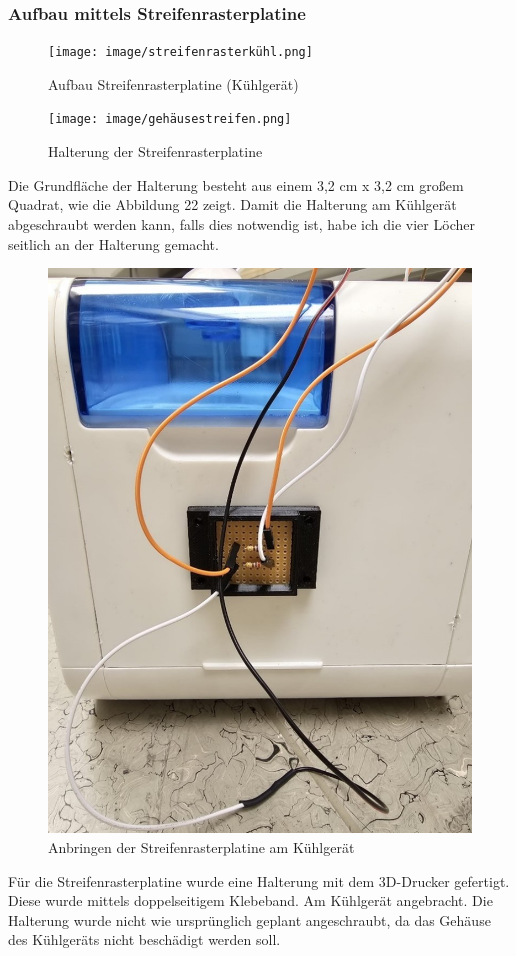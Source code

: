 \subsubsection{Aufbau mittels Streifenrasterplatine}
\begin{figure}[H]
    \centering
    \texttt{[image: image/streifenrasterkühl.png]}
    \caption{Aufbau Streifenrasterplatine (Kühlgerät)}
    \label{fig:enter-label}
\end{figure}
\vspace{3mm}
\begin{figure}[H]
	\centering
	\texttt{[image: image/gehäusestreifen.png]}
	\caption{Halterung der Streifenrasterplatine}
	\label{fig:enter-label}
\end{figure}
Die Grundfläche der Halterung besteht aus einem 3,2 cm x 3,2 cm großem Quadrat, wie die Abbildung 22 zeigt. Damit die Halterung am Kühlgerät abgeschraubt werden kann, falls dies notwendig ist, habe ich die vier Löcher seitlich an der Halterung gemacht.\\
\vspace{3mm}
\begin{figure}[H]
    \centering
    \includegraphics[scale=0.7]{image/streifenanbringen.jpg}
    \caption{Anbringen der Streifenrasterplatine am Kühlgerät}
    \label{fig:enter-label}
\end{figure}
Für die Streifenrasterplatine wurde eine Halterung mit dem 3D-Drucker gefertigt. Diese wurde mittels doppelseitigem Klebeband. Am Kühlgerät angebracht. Die Halterung wurde nicht wie ursprünglich geplant angeschraubt, da das Gehäuse des Kühlgeräts nicht beschädigt werden soll.
\newpage
